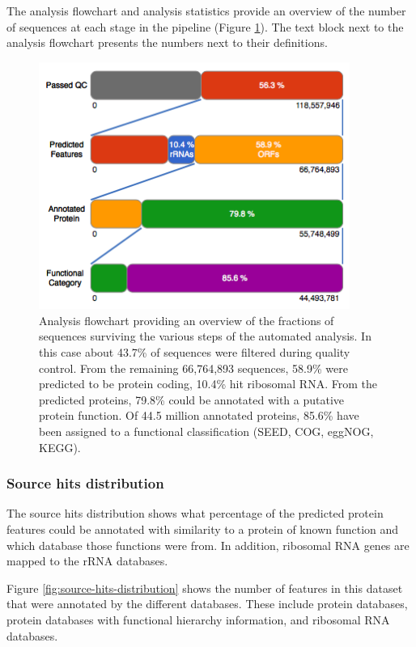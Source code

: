 \documentclass[12pt,fullpage]{report}
\begin{document}
The analysis flowchart and analysis statistics provide an overview of the number of sequences at each stage in the pipeline (Figure \ref{fig:analysis-flowchart}). The text block next to the analysis flowchart presents the numbers next to their definitions.
\begin{figure}
\begin{center}
\includegraphics[width=4in]{Images/analysis-flowchart.png}
\end{center}
\caption{
Analysis flowchart providing an overview of the fractions of sequences surviving the various steps of the automated analysis. In this case about 43.7\% of sequences were filtered during quality control. From the remaining 66,764,893 sequences, 58.9\% were predicted to be protein coding, 10.4\% hit ribosomal RNA. From the predicted proteins, 79.8\% could be annotated with a putative protein function. Of 44.5 million annotated proteins, 85.6\% have been assigned to a functional classification (\gls{SEED}, COG, eggNOG, KEGG).
}
\label{fig:analysis-flowchart}
\end{figure}

\subsubsection{Source hits distribution}
\label{section:source-hits-distribution}
The source hits distribution shows what percentage of the predicted protein features could be annotated with similarity to a protein of known function and which database those functions were from. In addition, ribosomal RNA genes are mapped to the rRNA databases.

Figure \ref{fig:source-hits-distribution} shows the number of features in this dataset that were annotated by the different databases. These include protein databases, protein databases with functional hierarchy information, and ribosomal RNA databases.
\end{document}
